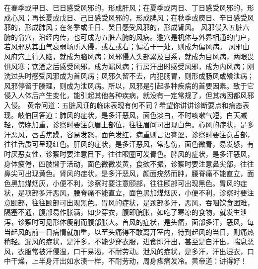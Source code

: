 \documentclass[a4paper,12pt,UTF8,twoside]{ctexbook}
\begin{document}
在春季或甲日、已日感受风邪的，形成肝风；在夏季或丙日、丁日感受风邪的，形成心风；再长夏或戊日、己日感受风邪的，形成脾风；在秋季或庾日、辛日感受风邪的，形成肺风；在冬季或壬日、癸日感受风邪的，形成肾风。
风邪侵入五脏六腑的俞穴，沿经内传，也可成为五脏六腑的风病。逾穴是机体与外界相通的门户，若风邪从其血气衰弱场所入侵，或左或右；偏着于一处，则成为偏风病。
风邪由风府穴上行入脑，就成为脑风病；风邪侵入头部累及目系，就成为目风病，两眼畏惧风寒；饮酒之后感受风邪，成为漏风病；行房汗出时感受风邪，成为内风病；刚洗过头时感受风邪成为首风病；风邪久留不去，内犯肠胃，则形成肠风或飧泄病；风邪停留于腠理，则成为泄风病。所以，风邪是引起多种疾病的首要因素。致于它侵入人体后产生变化，能引起其他各种疾病，就没有一定常规了，但其病因都风邪入侵。
黄帝问道：五脏风证的临床表现有何不同？希望你讲讲诊断要点和病态表现。岐伯回答道：肺风的症状，是多汗恶风，面色淡白，不时咳嗽气短，白天减轻，傍晚加重，诊察时要注意眉上部位，往往眉间可出现白色。心风的症状，是多汗恶风，唇舌焦躁，容易发怒，面色发红，病重则言语謇涩，诊察时要注意舌部，往往舌质可呈现红色。肝风的症状，是多汗恶风，常悲伤，面色微青，易发怒，有时厌恶女性，诊察时要注意目下，往往眼圈可发青色。脾风的症状，是多汗恶风，身体疲倦，四肢懒于活动，面色微微发黄，食欲不振，诊察时要注意鼻尖部，往往鼻尖可出现黄色。肾风的症状，是多汗恶风，颜面疣然而肿，腰脊痛不能直立，面色黑加煤烟灰，小便不利，诊察时要注意颐部，往往颐部可出现黑色。胃风的症状，是项部多汗恶风，腰脊痛不能直立，面色黑加煤烟灰，小便不利，诊察时要注意颐部，往往颐部可出现黑色。胃风的症状，是颈部多汗，恶风，吞咽饮食困难，隔塞不通，腹部易作胀满，如少穿衣，腹即脘胀，如吃了寒凉的食物，就发生泄泻，诊察时可见形体瘦削而腹部胀大。首风的症状，是头痛，面部多汗，恶风，每当起风的前一日病情就加重，以至头痛得不敢离开室内，待到起风的当日，则痛热稍轻。漏风的症状，是汗多，不能少穿衣服，进食即汗出，甚至是自汗出，喘息恶风，衣服常被汗侵湿，口干易渴，不耐劳动。泄风的症状，是多汗，汗出湿衣，口中干燥，上半身汗出如水渍一样，不耐劳动，周身疼痛发冷。黄帝道：讲得好！
\end{document}
